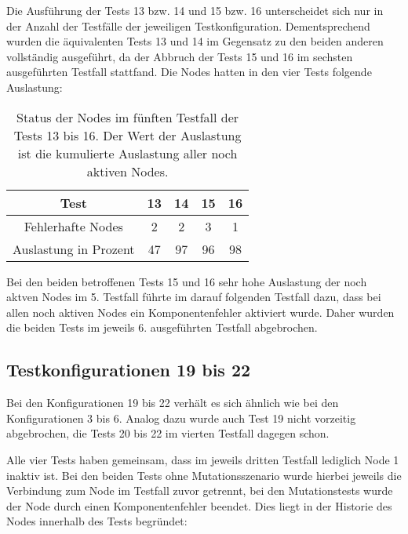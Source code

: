 Die Ausführung der Tests 13 bzw. 14 und 15 bzw. 16 unterscheidet sich nur in der Anzahl der Testfälle der jeweiligen Testkonfiguration.
Dementsprechend wurden die äquivalenten Tests 13 und 14 im Gegensatz zu den beiden anderen vollständig ausgeführt, da der Abbruch der Tests 15 und 16 im sechsten ausgeführten Testfall stattfand.
Die Nodes hatten in den vier Tests folgende Auslastung:

\begin{table}[h]
    \begin{tabular}{c|cccc}
    	        Test          & 13 & 14 & 15 & 16 \\ \hline
    	  Fehlerhafte Nodes   & 2  & 2  & 3  & 1  \\
    	Auslastung in Prozent & 47 & 97 & 96 & 98
    \end{tabular}
    \caption[Status der Nodes im fünften Testfall der Tests 13 bis 16]
        {Status der Nodes im fünften Testfall der Tests 13 bis 16.
        Der Wert der Auslastung ist die kumulierte Auslastung aller noch aktiven Nodes.}
    \label{tab:loadTests1316}
\end{table}

Bei den beiden betroffenen Tests 15 und 16 sehr hohe Auslastung der noch aktven Nodes im 5. Testfall führte im darauf folgenden Testfall dazu, dass bei allen noch aktiven Nodes ein Komponentenfehler aktiviert wurde.
Daher wurden die beiden Tests im jeweils 6. ausgeführten Testfall abgebrochen.

\subsection{Testkonfigurationen 19 bis 22}
\label{sec:noReconf1922}

Bei den Konfigurationen 19 bis 22 verhält es sich ähnlich wie bei den Konfigurationen 3 bis 6.
Analog dazu wurde auch Test 19 nicht vorzeitig abgebrochen, die Tests 20 bis 22 im vierten Testfall dagegen schon.

Alle vier Tests haben gemeinsam, dass im jeweils dritten Testfall lediglich Node 1 inaktiv ist.
Bei den beiden Tests ohne Mutationsszenario wurde hierbei jeweils die Verbindung zum Node im Testfall zuvor getrennt, bei den Mutationstests wurde der Node durch einen Komponentenfehler beendet.
Dies liegt in der Historie des Nodes innerhalb des Tests begründet:

